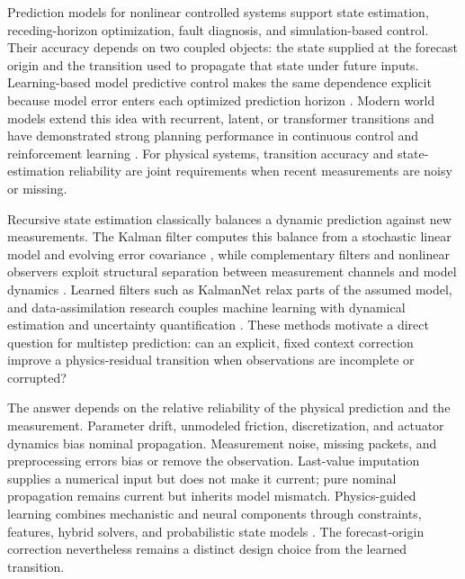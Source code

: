 \documentclass[iicol,pdflatex,sn-basic,Numbered]{sn-jnl}
\begin{document}
Prediction models for nonlinear controlled systems support state estimation,
receding-horizon optimization, fault diagnosis, and simulation-based control.
Their accuracy depends on two coupled objects: the state supplied at the
forecast origin and the transition used to propagate that state under future
inputs. Learning-based model predictive control makes the same dependence
explicit because model error enters each optimized prediction horizon
\cite{hewing2020_learning_mpc}. Modern world models extend this idea with
recurrent, latent, or transformer transitions and have demonstrated strong
planning performance in continuous control and reinforcement learning
\cite{hafner2025_mastering_diverse_control_tasks_through,hansen2023_td_mpc2_scalable_robust_world,micheli2022_transformers_are_sample_efficient_world,zhang2023_storm_efficient_stochastic_transformer_based}.
For physical systems, transition accuracy and state-estimation reliability are
joint requirements when recent measurements are noisy or missing.

Recursive state estimation classically balances a dynamic prediction against
new measurements. The Kalman filter computes this balance from a stochastic
linear model and evolving error covariance \cite{kalman1960_filtering}, while
complementary filters and nonlinear observers exploit structural separation
between measurement channels and model dynamics
\cite{mahony2008_complementary,zhao2023_wheel_rail_observer}. Learned filters
such as KalmanNet relax parts of the assumed model, and data-assimilation
research couples machine learning with dynamical estimation and uncertainty
quantification
\cite{revach2022_kalmannet,cheng2023_machine_learning_with_data_assimilation}.
These methods motivate a direct question for multistep prediction: can an
explicit, fixed context correction improve a physics-residual transition when
observations are incomplete or corrupted?

The answer depends on the relative reliability of the physical prediction and
the measurement. Parameter drift, unmodeled friction, discretization, and
actuator dynamics bias nominal propagation. Measurement noise, missing packets,
and preprocessing errors bias or remove the observation. Last-value imputation
supplies a numerical input but does not make it current; pure nominal
propagation remains current but inherits model mismatch. Physics-guided
learning combines mechanistic and neural components through constraints,
features, hybrid solvers, and probabilistic state models
\cite{karniadakis2021_physics_informed_machine_learning,willard2022_integrating_scientific_knowledge_with_machine,yu2024_learning_dynamical_systems_from_data,shen2023_differentiable_modelling_to_unify_machine}.
The forecast-origin correction nevertheless remains a distinct design choice
from the learned transition.
\end{document}
